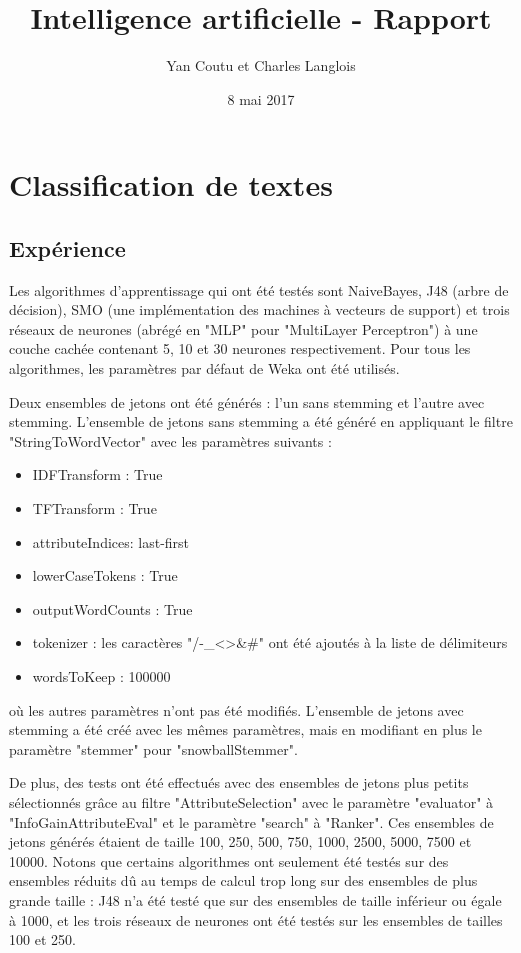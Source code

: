 \documentclass[11pt]{article} %
\title{Intelligence artificielle - Rapport}
\author{Yan Coutu et Charles Langlois}
\date{8 mai 2017}
\begin{document}
\maketitle

\section { Classification de textes }

\subsection{Expérience}

Les algorithmes d'apprentissage qui ont été testés sont NaiveBayes, J48 (arbre de décision), SMO (une implémentation des machines à vecteurs de support) et trois réseaux de neurones (abrégé en "MLP" pour "MultiLayer Perceptron") à une couche cachée contenant 5, 10 et 30 neurones respectivement. Pour tous les algorithmes, les paramètres par défaut de Weka ont été utilisés.

Deux ensembles de jetons ont été générés : l'un sans stemming et l'autre avec stemming. L'ensemble de jetons sans stemming a été généré en appliquant le filtre "StringToWordVector" avec les paramètres suivants :

\begin{itemize}
\item IDFTransform : True
\item TFTransform : True
\item attributeIndices: last-first
\item lowerCaseTokens : True
\item outputWordCounts : True
\item tokenizer : les caractères "/-\_\textless\textgreater\&\#" ont été ajoutés à la liste de délimiteurs
\item wordsToKeep : 100000
\end{itemize}

où les autres paramètres n'ont pas été modifiés. L'ensemble de jetons avec stemming a été créé avec les mêmes paramètres, mais en modifiant en plus le paramètre "stemmer" pour "snowballStemmer".

De plus, des tests ont été effectués avec des ensembles de jetons plus petits sélectionnés grâce au filtre "AttributeSelection" avec le paramètre "evaluator" à "InfoGainAttributeEval" et le paramètre "search" à "Ranker". Ces ensembles de jetons générés étaient de taille 100, 250, 500, 750, 1000, 2500, 5000, 7500 et 10000. Notons que certains algorithmes ont seulement été testés sur des ensembles réduits dû au temps de calcul trop long sur des ensembles de plus grande taille :  J48 n'a été testé que sur des ensembles de taille inférieur ou égale à 1000, et les trois réseaux de neurones ont été testés sur les ensembles de tailles 100 et 250.
\end{document}
